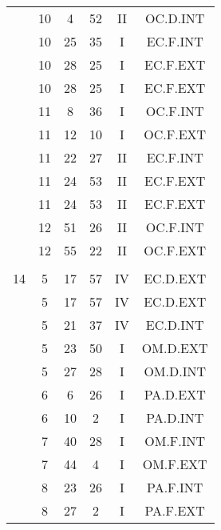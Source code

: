 \documentclass[12pt, a4paper]{article}
\begin{document}
\begin{multicols}{3}
{\begin{tabular}{c c c c c c}
	 	 	 	 & 10 & 4 & 52 & II & OC.D.INT\\%
	 	 	 	 & 10 & 25 & 35 & I & EC.F.INT\\%
	 	 	 	 & 10 & 28 & 25 & I & EC.F.EXT\\%
	 	 	 	 & 10 & 28 & 25 & I & EC.F.EXT\\%
	 	 	 	 & 11 & 8 & 36 & I & OC.F.INT\\%
	 	 	 	 & 11 & 12 & 10 & I & OC.F.EXT\\%
	 	 	 	 & 11 & 22 & 27 & II & EC.F.INT\\%
	 	 	 	 & 11 & 24 & 53 & II & EC.F.EXT\\%
	 	 	 	 & 11 & 24 & 53 & II & EC.F.EXT\\%
	 	 	 	 & 12 & 51 & 26 & II & OC.F.INT\\%
	 	 	 	 & 12 & 55 & 22 & II & OC.F.EXT\\%
	 	 	 	 & & & & & \\%
	 	 	 	14 & 5 & 17 & 57 & IV & EC.D.EXT\\%
	 	 	 	 & 5 & 17 & 57 & IV & EC.D.EXT\\%
	 	 	 	 & 5 & 21 & 37 & IV & EC.D.INT\\%
	 	 	 	 & 5 & 23 & 50 & I & OM.D.EXT\\%
	 	 	 	 & 5 & 27 & 28 & I & OM.D.INT\\%
	 	 	 	 & 6 & 6 & 26 & I & PA.D.EXT\\%
	 	 	 	 & 6 & 10 & 2 & I & PA.D.INT\\%
	 	 	 	 & 7 & 40 & 28 & I & OM.F.INT\\%
	 	 	 	 & 7 & 44 & 4 & I & OM.F.EXT\\%
	 	 	 	 & 8 & 23 & 26 & I & PA.F.INT\\%
	 	 	 	 & 8 & 27 & 2 & I & PA.F.EXT\\%

\end{tabular}}
\end{multicols}
\end{document}
